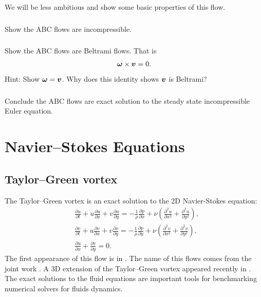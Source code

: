 \documentclass[11pt,letterpaper]{report}
\begin{document}
We will be less ambitious and show some basic properties of this flow.
\subsection{}
Show the ABC flows are incompressible.

\subsection{}
Show the ABC flows are Beltrami flows. That is
\begin{align}
    \boldsymbol{\omega}\times\boldsymbol{v} = 0.
\end{align}
Hint: Show $\boldsymbol{\omega} = \boldsymbol{v}$. Why does this identity shows $\boldsymbol{v}$ is Beltrami?

\subsection{}
Conclude the ABC flows are exact solution to the steady state incompressible Euler equation.

\chapter{Navier–Stokes Equations}
\section{Taylor–Green vortex}
The Taylor–Green vortex is an exact solution to the 2D Navier-Stokes equation:
\begin{align}
    &\frac{\partial u}{\partial t} + u\frac{\partial u}{\partial x} + v\frac{\partial u}{\partial y} = -\frac{1}{\rho} \frac{\partial p}{\partial x} + \nu \left( \frac{\partial^2 u}{\partial x^2} + \frac{\partial^2 u}{\partial y^2} \right),\\
    &\frac{\partial v}{\partial t} + u\frac{\partial v}{\partial x} + v\frac{\partial v}{\partial y} = -\frac{1}{\rho} \frac{\partial p}{\partial y} + \nu \left( \frac{\partial^2 v}{\partial x^2} + \frac{\partial^2 v}{\partial y^2} \right),\\
    &\frac{\partial u}{\partial x}+ \frac{\partial v}{\partial y} = 0.
\end{align}
The first appearance of this flow is in \cite{Taylor_23}. The name of this flows comes from the joint work \cite{TaylorGreen_37}. A 3D extension of the Taylor–Green vortex appeared recently in \cite{Antuono_20}. The exact solutions to the fluid equations are important tools for benchmarking numerical solvers for fluids dynamics. 
\end{document}
